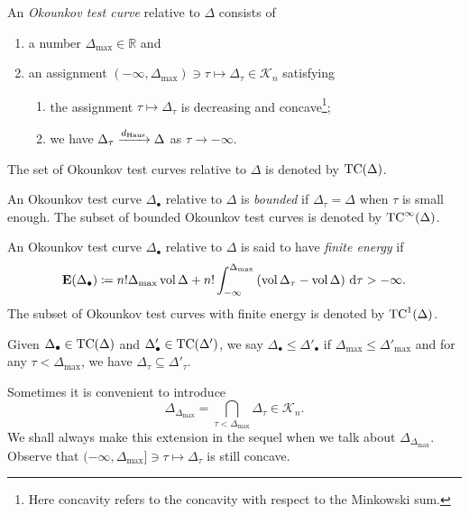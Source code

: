 \begin{definition}\label{def:Otc}
	An \emph{Okounkov test curve} relative to $\Delta$ consists of
    \begin{enumerate}
        \item\label{itm:def:Otc:1} a number $\Delta_{\max}\in \mathbb{R}$ and
        \item\label{itm:def:Otc:2} an assignment $(-\infty,\Delta_{\max})\ni\tau \mapsto \Delta_{\tau}\in \mathcal{K}_n$ satisfying
        \begin{enumerate}
            \item\label{itm:def:Otc:2:a} the assignment $\tau\mapsto \Delta_{\tau}$ is decreasing and concave\footnote{Here concavity refers to the concavity with respect to the Minkowski sum.};
            \item\label{itm:def:Otc:2:b} we have $\Delta_{\tau}\xrightarrow{d_{\mathrm{Haus}}}\Delta$ as $\tau\to-\infty$.
        \end{enumerate}
    \end{enumerate}
    The set of Okounkov test curves relative to $\Delta$ is denoted by $\TC(\Delta)$\index{$\TC(\Delta)$}.

    An Okounkov test curve $\Delta_{\bullet}$ relative to $\Delta$ is \emph{bounded} if $\Delta_{\tau}=\Delta$ when $\tau$ is small enough. The subset of bounded Okounkov test curves is denoted by $\TC^{\infty}(\Delta)$\index{$\TC^{\infty}(\Delta)$}.

    An Okounkov test curve $\Delta_{\bullet}$ relative to $\Delta$ is said to have \emph{finite energy} if
    \begin{equation}\label{eq:Otestcurvenergy}
    \mathbf{E}(\Delta_{\bullet})\coloneqq n!\Delta_{\max} \operatorname{vol} \Delta+n!\int_{-\infty}^{\Delta_{\max}} \left(\operatorname{vol} \Delta_{\tau}-\operatorname{vol} \Delta\right)\,\mathrm{d}\tau>-\infty.
    \end{equation}
    The subset of Okounkov test curves with finite energy is denoted by $\mathrm{TC}^{1}(\Delta)$.

    Given $\Delta_{\bullet}\in \mathrm{TC}(\Delta)$ and $\Delta'_{\bullet}\in \mathrm{TC}(\Delta')$, we say $\Delta_{\bullet}\leq \Delta'_{\bullet}$ if $\Delta_{\max}\leq \Delta'_{\max}$ and for any $\tau<\Delta_{\max}$, we have $\Delta_{\tau}\subseteq \Delta'_{\tau}$.
\end{definition}
Sometimes it is convenient to introduce
\begin{equation}\label{eq:DeltaDeltamax}
    \Delta_{\Delta_{\max}}=\bigcap_{\tau<\Delta_{\max}}\Delta_{\tau}\in \mathcal{K}_n.
\end{equation}
We shall always make this extension in the sequel when we talk about $\Delta_{\Delta_{\max}}$. Observe that $(-\infty,\Delta_{\max}]\ni\tau \mapsto \Delta_{\tau}$ is still concave.

